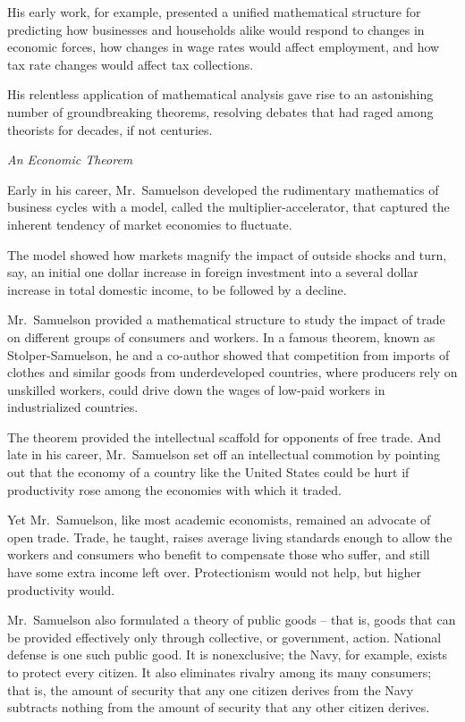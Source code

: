 ﻿\documentclass[12pt]{article}
\begin{document}
His early work, for example, presented a unified mathematical structure for predicting how
businesses and households alike would respond to changes in economic forces, how changes in wage
rates would affect employment, and how tax rate changes would affect tax collections.

His relentless application of mathematical analysis gave rise to an astonishing number of
groundbreaking theorems, resolving debates that had raged among theorists for decades, if not
centuries.

\emph{An Economic Theorem}

Early in his career, Mr.~Samuelson developed the rudimentary mathematics of business cycles with a
model, called the multiplier-accelerator, that captured the inherent tendency of market economies to
fluctuate.

The model showed how markets magnify the impact of outside shocks and turn, say, an initial one
dollar increase in foreign investment into a several dollar increase in total domestic income, to be
followed by a decline.

Mr.~Samuelson provided a mathematical structure to study the impact of trade on different groups of
consumers and workers. In a famous theorem, known as Stolper-Samuelson, he and a co-author showed
that competition from imports of clothes and similar goods from underdeveloped countries, where
producers rely on unskilled workers, could drive down the wages of low-paid workers in
industrialized countries.

The theorem provided the intellectual scaffold for opponents of free trade. And late in his career,
Mr.~Samuelson set off an intellectual commotion by pointing out that the economy of a country like
the United States could be hurt if productivity rose among the economies with which it traded.

Yet Mr.~Samuelson, like most academic economists, remained an advocate of open trade. Trade, he
taught, raises average living standards enough to allow the workers and consumers who benefit to
compensate those who suffer, and still have some extra income left over. Protectionism would not
help, but higher productivity would.

Mr.~Samuelson also formulated a theory of public goods -- that is, goods that can be provided
effectively only through collective, or government, action. National defense is one such public
good. It is nonexclusive; the Navy, for example, exists to protect every citizen. It also eliminates
rivalry among its many consumers; that is, the amount of security that any one citizen derives from
the Navy subtracts nothing from the amount of security that any other citizen derives.
\end{document}
